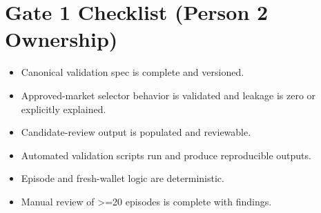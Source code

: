 \documentclass{article}
\begin{document}
\section*{Gate 1 Checklist (Person 2 Ownership)}
\begin{itemize}
\item Canonical validation spec is complete and versioned.
\item Approved-market selector behavior is validated and leakage is zero or explicitly explained.
\item Candidate-review output is populated and reviewable.
\item Automated validation scripts run and produce reproducible outputs.
\item Episode and fresh-wallet logic are deterministic.
\item Manual review of >=20 episodes is complete with findings.
\end{itemize}
\end{document}

